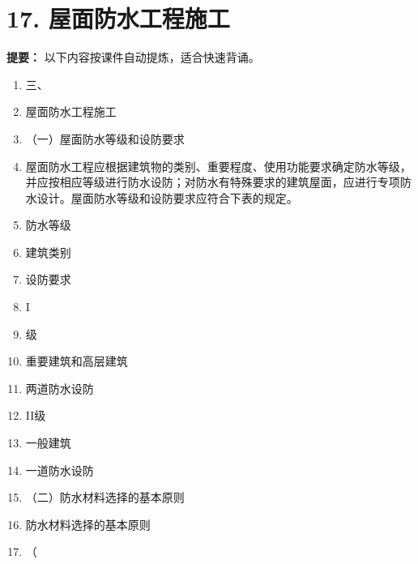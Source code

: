 \documentclass[UTF8,fontset=fandol,11pt]{ctexart}
\begin{document}
\newpage

\section*{17. 屋面防水工程施工}


\begin{mainbox}

\textbf{提要：} 以下内容按课件自动提炼，适合快速背诵。

\end{mainbox}

\begin{enumerate}[label=\arabic*.]

\item 三、

\item 屋面防水工程施工

\item （一）屋面防水等级和设防要求

\item 屋面防水工程应根据建筑物的类别、重要程度、使用功能要求确定防水等级，并应按相应等级进行防水设防；对防水有特殊要求的建筑屋面，应进行专项防水设计。屋面防水等级和设防要求应符合下表的规定。

\item 防水等级

\item 建筑类别

\item 设防要求

\item I

\item 级

\item 重要建筑和高层建筑

\item 两道防水设防

\item II级

\item 一般建筑

\item 一道防水设防

\item （二）防水材料选择的基本原则

\item 防水材料选择的基本原则

\item （


\end{enumerate}
\end{document}
